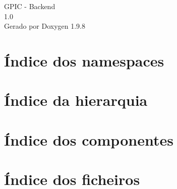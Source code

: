 \documentclass[twoside]{book}
\newcommand{\+}{\discretionary{\mbox{\scriptsize$\hookleftarrow$}}{}{}}
\newcommand{\clearemptydoublepage}{%
    \newpage{\pagestyle{empty}\cleardoublepage}%
  }
\begin{document}
  \raggedbottom
    \hypersetup{pageanchor=false,
                bookmarksnumbered=true,
                pdfencoding=unicode
               }
  \begin{titlepage}
  \vspace*{7cm}
  \begin{center}%
  {\Large GPIC -\/ Backend}\\
  [1ex]\large 1.\+0 \\
  \vspace*{1cm}
  {\large Gerado por Doxygen 1.9.8}\\
  \end{center}
  \end{titlepage}
  \clearemptydoublepage
  \tableofcontents
  \clearemptydoublepage
  \hypersetup{pageanchor=true}


\chapter{Índice dos namespaces}

\chapter{Índice da hierarquia}

\chapter{Índice dos componentes}

\chapter{Índice dos ficheiros}

\end{document}
